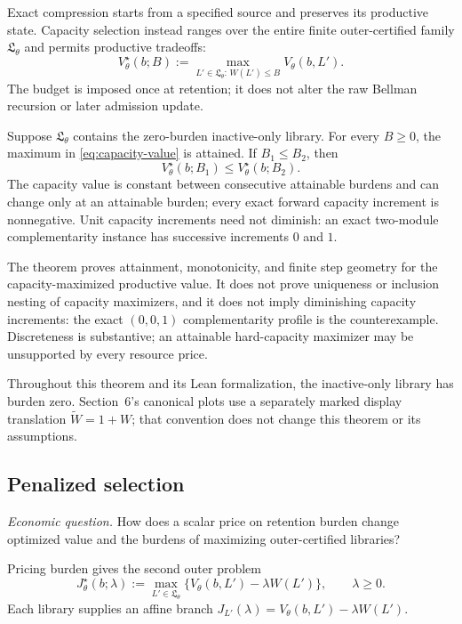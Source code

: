 Exact compression starts from a specified source and preserves its productive
state.  Capacity selection instead ranges over the entire finite
outer-certified family \(\mathfrak L_\theta\) and permits productive tradeoffs:
\begin{equation}\label{eq:capacity-value}
 V_\theta^\star(b;B)
 :=\max_{L'\in\mathfrak L_\theta:\,W(L')\le B}V_\theta(b,L').
\end{equation}
The budget is imposed once at retention; it does not alter the raw Bellman
recursion or later admission update.

\begin{theorem}
\label{thm:capacity-value}
Suppose \(\mathfrak L_\theta\) contains the zero-burden inactive-only library.
For every \(B\ge0\), the maximum in \eqref{eq:capacity-value} is attained.
If \(B_1\le B_2\), then
\[
 V_\theta^\star(b;B_1)\le V_\theta^\star(b;B_2).
\]
The capacity value is constant between consecutive attainable burdens and can
change only at an attainable burden; every exact forward capacity increment
is nonnegative.  Unit capacity increments need not diminish: an exact
two-module complementarity instance has successive increments \(0\) and \(1\).
\end{theorem}

The theorem proves attainment, monotonicity, and finite step geometry for the
capacity-maximized productive value.  It does not prove uniqueness or
inclusion nesting of capacity maximizers, and it does not imply diminishing
capacity increments: the exact \((0,0,1)\) complementarity profile is the
counterexample.  Discreteness is substantive; an attainable hard-capacity
maximizer may be unsupported by every resource price.

Throughout this theorem and its Lean formalization, the inactive-only library
has burden zero.  Section~6's canonical plots use a separately marked display
translation \(\widetilde W=1+W\); that convention does not change this theorem
or its assumptions.

\subsection{Penalized selection}

\emph{Economic question.}  How does a scalar price on retention burden change
optimized value and the burdens of maximizing outer-certified libraries?

Pricing burden gives the second outer problem
\begin{equation}\label{eq:penalized-value}
 J_\theta^\star(b;\lambda)
 :=\max_{L'\in\mathfrak L_\theta}
 \{V_\theta(b,L')-\lambda W(L')\},
 \qquad \lambda\ge0.
\end{equation}
Each library supplies an affine branch
\(J_{L'}(\lambda)=V_\theta(b,L')-\lambda W(L')\).

